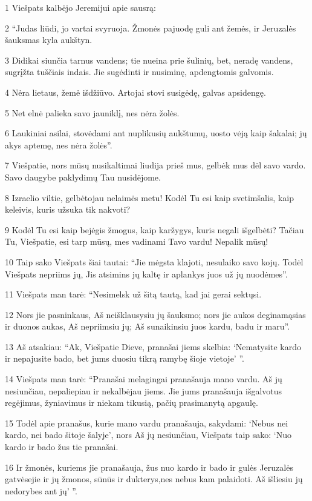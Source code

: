 \par 1 Viešpats kalbėjo Jeremijui apie sausrą: 
\par 2 “Judas liūdi, jo vartai svyruoja. Žmonės pajuodę guli ant žemės, ir Jeruzalės šauksmas kyla aukštyn. 
\par 3 Didikai siunčia tarnus vandens; tie nueina prie šulinių, bet, neradę vandens, sugrįžta tuščiais indais. Jie sugėdinti ir nusiminę, apdengtomis galvomis. 
\par 4 Nėra lietaus, žemė išdžiūvo. Artojai stovi susigėdę, galvas apsidengę. 
\par 5 Net elnė palieka savo jauniklį, nes nėra žolės. 
\par 6 Laukiniai asilai, stovėdami ant nuplikusių aukštumų, uosto vėją kaip šakalai; jų akys aptemę, nes nėra žolės”. 
\par 7 Viešpatie, nors mūsų nusikaltimai liudija prieš mus, gelbėk mus dėl savo vardo. Savo daugybe paklydimų Tau nusidėjome. 
\par 8 Izraelio viltie, gelbėtojau nelaimės metu! Kodėl Tu esi kaip svetimšalis, kaip keleivis, kuris užsuka tik nakvoti? 
\par 9 Kodėl Tu esi kaip bejėgis žmogus, kaip karžygys, kuris negali išgelbėti? Tačiau Tu, Viešpatie, esi tarp mūsų, mes vadinami Tavo vardu! Nepalik mūsų! 
\par 10 Taip sako Viešpats šiai tautai: “Jie mėgsta klajoti, nesulaiko savo kojų. Todėl Viešpats nepriims jų, Jis atsimins jų kaltę ir aplankys juos už jų nuodėmes”. 
\par 11 Viešpats man tarė: “Nesimelsk už šitą tautą, kad jai gerai sektųsi. 
\par 12 Nors jie pasninkaus, Aš neišklausysiu jų šauksmo; nors jie aukos deginamąsias ir duonos aukas, Aš nepriimsiu jų; Aš sunaikinsiu juos kardu, badu ir maru”. 
\par 13 Aš atsakiau: “Ak, Viešpatie Dieve, pranašai jiems skelbia: ‘Nematysite kardo ir nepajusite bado, bet jums duosiu tikrą ramybę šioje vietoje’ ”. 
\par 14 Viešpats man tarė: “Pranašai melagingai pranašauja mano vardu. Aš jų nesiunčiau, nepaliepiau ir nekalbėjau jiems. Jie jums pranašauja išgalvotus regėjimus, žyniavimus ir niekam tikusią, pačių prasimanytą apgaulę. 
\par 15 Todėl apie pranašus, kurie mano vardu pranašauja, sakydami: ‘Nebus nei kardo, nei bado šitoje šalyje’, nors Aš jų nesiunčiau, Viešpats taip sako: ‘Nuo kardo ir bado žus tie pranašai. 
\par 16 Ir žmonės, kuriems jie pranašauja, žus nuo kardo ir bado ir gulės Jeruzalės gatvėse­jie ir jų žmonos, sūnūs ir dukterys,­nes nebus kam palaidoti. Aš išliesiu jų nedorybes ant jų’ ”. 
